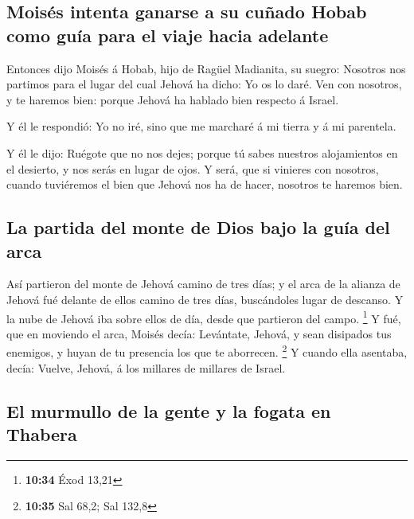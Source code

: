 \hypertarget{moisuxe9s-intenta-ganarse-a-su-cuuxf1ado-hobab-como-guuxeda-para-el-viaje-hacia-adelante}{%
\subsection{Moisés intenta ganarse a su cuñado Hobab como guía para el
viaje hacia
adelante}\label{moisuxe9s-intenta-ganarse-a-su-cuuxf1ado-hobab-como-guuxeda-para-el-viaje-hacia-adelante}}

 Entonces dijo Moisés á Hobab, hijo de Ragüel Madianita,
su suegro: Nosotros nos partimos para el lugar del cual Jehová ha dicho:
Yo os lo daré. Ven con nosotros, y te haremos bien: porque Jehová ha
hablado bien respecto á Israel.

 Y él le respondió: Yo no iré, sino que me marcharé á mi
tierra y á mi parentela.

 Y él le dijo: Ruégote que no nos dejes; porque tú sabes
nuestros alojamientos en el desierto, y nos serás en lugar de ojos.
 Y será, que si vinieres con nosotros, cuando tuviéremos
el bien que Jehová nos ha de hacer, nosotros te haremos bien.

\hypertarget{la-partida-del-monte-de-dios-bajo-la-guuxeda-del-arca}{%
\subsection{La partida del monte de Dios bajo la guía del
arca}\label{la-partida-del-monte-de-dios-bajo-la-guuxeda-del-arca}}

 Así partieron del monte de Jehová camino de tres días; y
el arca de la alianza de Jehová fué delante de ellos camino de tres
días, buscándoles lugar de descanso.  Y la nube de Jehová
iba sobre ellos de día, desde que partieron del campo. \footnote{\textbf{10:34}
  Éxod 13,21}  Y fué, que en moviendo el arca, Moisés
decía: Levántate, Jehová, y sean disipados tus enemigos, y huyan de tu
presencia los que te aborrecen. \footnote{\textbf{10:35} Sal 68,2; Sal
  132,8}  Y cuando ella asentaba, decía: Vuelve, Jehová,
á los millares de millares de Israel.

\hypertarget{el-murmullo-de-la-gente-y-la-fogata-en-thabera}{%
\subsection{El murmullo de la gente y la fogata en
Thabera}\label{el-murmullo-de-la-gente-y-la-fogata-en-thabera}}

